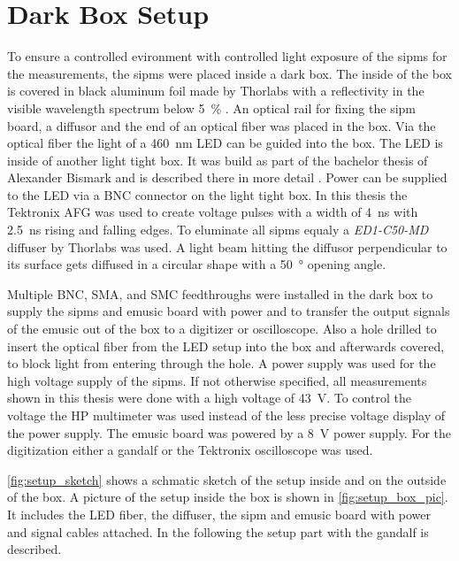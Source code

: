 \section{Dark Box Setup}
To ensure a controlled evironment with controlled light exposure of the \acp{sipm} for the measurements, the \acp{sipm} were placed inside a dark box.
The inside of the box is covered in black aluminum foil made by Thorlabs with a reflectivity in the visible wavelength spectrum below \SI{5}{\percent} \cite{BKF12}.
An optical rail for fixing the \ac{sipm} board, a diffusor and the end of an optical fiber was placed in the box.
Via the optical fiber the light of a \SI{460}{\nano\meter} LED can be guided into the box.
The LED is inside of another light tight box.
It was build as part of the bachelor thesis of Alexander Bismark and is described there in more detail \cite{Bismark}.
Power can be supplied to the LED via a BNC connector on the light tight box.
In this thesis the Tektronix AFG was used to create voltage pulses with a width of \SI{4}{\nano\second} with \SI{2.5}{\nano\second} rising and falling edges.
To eluminate all \acp{sipm} equaly a \textit{ED1-C50-MD} diffuser by Thorlabs was used.
A light beam hitting the diffusor perpendicular to its surface gets diffused in a circular shape with a \SI{50}{\degree} opening angle.

Multiple BNC, SMA, and SMC feedthroughs were installed in the dark box to supply the \acp{sipm} and \ac{emusic} board with power and to transfer the output signals of the \ac{emusic} out of the box to a digitizer or oscilloscope.
Also a hole drilled to insert the optical fiber from the LED setup into the box and afterwards covered, to block light from entering through the hole.
A power supply was used for the high voltage supply of the \acp{sipm}.
If not otherwise specified, all measurements shown in this thesis were done with a high voltage of \SI{43}{\volt}.
To control the voltage the HP multimeter was used instead of the less precise voltage display of the power supply.
The \ac{emusic} board was powered by a \SI{8}{\volt} power supply.
For the digitization either a \ac{gandalf} or the Tektronix oscilloscope was used.

\autoref{fig:setup_sketch} shows a schmatic sketch of the setup inside and on the outside of the box.
A picture of the setup inside the box is shown in \autoref{fig:setup_box_pic}.
It includes the LED fiber, the diffuser, the \ac{sipm} and \ac{emusic} board with power and signal cables attached.
In the following the setup part with the \ac{gandalf} is described.

